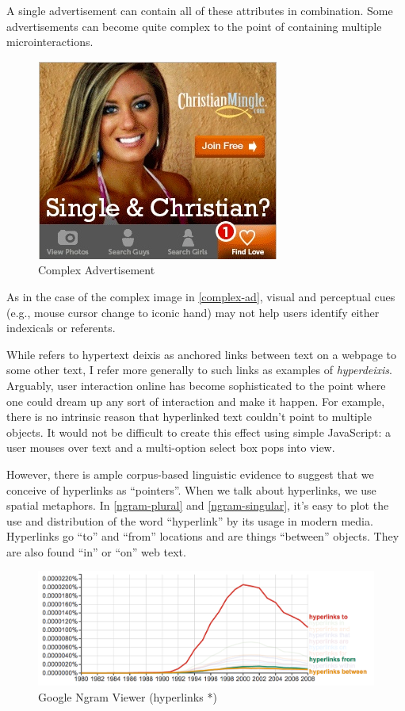 A single advertisement can contain all of these attributes in combination. Some advertisements can become quite complex to the point of containing multiple microinteractions.


\begin{figure}
\centerline{
  \includegraphics{chapter6.tex/complex}
  }
\caption{Complex Advertisement}
\label{complex-ad}
\end{figure}


As in the case of the complex image in  \autoref{complex-ad},  visual and perceptual cues (e.g., mouse cursor change to iconic hand) may not help users identify either indexicals or referents.

While  \citet{Loehr:1997uq}  refers to hypertext deixis as anchored links between text on a webpage to some other text, I refer more generally to such links as examples of \emph{hyperdeixis}. Arguably, user interaction online has become sophisticated to the point where one could dream up any sort of interaction and make it happen. For example, there is no intrinsic reason that hyperlinked text couldn't point to multiple objects. It would not be difficult to create this effect using simple JavaScript: a user mouses over text and a multi-option select box pops into view.

However, there is ample corpus-based linguistic evidence to suggest that we conceive of hyperlinks as ``pointers''. When we talk about hyperlinks, we use spatial metaphors. In  \autoref{ngram-plural} and  \autoref{ngram-singular},  it's easy to plot the use and distribution of the word ``hyperlink'' by its usage in modern media. Hyperlinks go ``to'' and ``from'' locations and are things ``between'' objects. They are also found ``in'' or ``on'' web text.


\begin{figure}
\centerline{
  \includegraphics[scale=.25]{chapter6.tex/ngram1}
  }
\caption{Google Ngram Viewer (hyperlinks *)}
\label{ngram-plural}
\end{figure}



